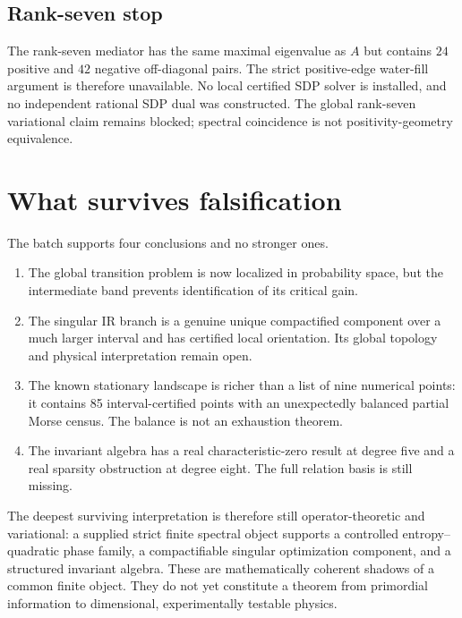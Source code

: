 \documentclass[11pt,a4paper]{article}
\begin{document}
\subsection{Rank-seven stop}

The rank-seven mediator has the same maximal eigenvalue as $A$ but contains
$24$ positive and $42$ negative off-diagonal pairs.  The strict positive-edge
water-fill argument is therefore unavailable.  No local certified SDP solver
is installed, and no independent rational SDP dual was constructed.  The
global rank-seven variational claim remains blocked; spectral coincidence is
not positivity-geometry equivalence.

\section{What survives falsification}

The batch supports four conclusions and no stronger ones.

\begin{enumerate}[leftmargin=1.6em]
\item The global transition problem is now localized in probability space,
but the intermediate band prevents identification of its critical gain.
\item The singular IR branch is a genuine unique compactified component over a
much larger interval and has certified local orientation.  Its global topology
and physical interpretation remain open.
\item The known stationary landscape is richer than a list of nine numerical
points: it contains 85 interval-certified points with an unexpectedly balanced
partial Morse census.  The balance is not an exhaustion theorem.
\item The invariant algebra has a real characteristic-zero result at degree
five and a real sparsity obstruction at degree eight.  The full relation basis
is still missing.
\end{enumerate}

The deepest surviving interpretation is therefore still operator-theoretic
and variational: a supplied strict finite spectral object supports a controlled
entropy--quadratic phase family, a compactifiable singular optimization
component, and a structured invariant algebra.  These are mathematically
coherent shadows of a common finite object.  They do not yet constitute a
theorem from primordial information to dimensional, experimentally testable
physics.
\end{document}
